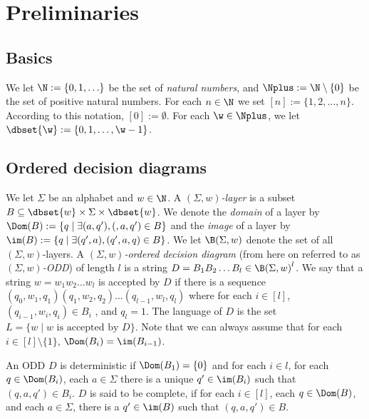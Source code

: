 \newpage
\section{Preliminaries}

\subsection{Basics}
We let $\N:= \{0,1, \ldots \}$ be the set of {\em natural numbers}, 
and $\Nplus:= \N \setminus \{0\}$ be the set of positive natural numbers. 
For each $n \in \N$ we set $[n]:=\{1,2, \ldots,n\}$. According to this notation,
$[0]:= \emptyset$. For each $\w \in \Nplus$, we let $\dbset{\w}:= \{0,1,\ldots,
\w-1\}$. 

\subsection{ Ordered decision diagrams} 
We let $\Sigma$ be an alphabet and $w \in \N$. A  $(\Sigma, w)$\emph{-layer} is a subset $B \subseteq \dbset{w} \times \Sigma \times \dbset{w}$. We denote the \emph{domain} of a layer by $\Dom(B):= \{q \;|\; \exists (a,q'), (,a,q') \in B\}$ and the \emph{image} of a layer by $\im(B):= \{q \;|\; \exists (q',a), (q',a,q) \in B\}$. We let  $\B(\Sigma, w)$ denote the set of all $(\Sigma,w)$-layers. A $(\Sigma,w)$\emph{-ordered decision diagram} (from here on referred to as $(\Sigma,w)$\emph{-ODD}) of length $l$ is a string $D = B_1B_2\ldots B_l \in {\B(\Sigma, w)}^l$. We say that a string $w=w_1 w_2 \ldots w_l$ is accepted by $D$ if there is a sequence $(q_0, w_1,q_1)(q_1,w_2,q_2)\ldots(q_{l-1},w_l,q_l)$ where for each $i \in [l]$, $(q_{i-1},w_i,q_i) \in B_i$ , and $q_l = 1$. The language of $D$ is the set $L= \{w\; | \; w \text{ is accepted by } D\}$. Note that we can always assume that for each $i \in [l] \setminus \{1\}$, $\Dom(B_i) = \im(B_{i-1})$. \

An ODD $D$ is deterministic if $\Dom(B_1) = \{0\}$ and for each $i \in l$, for each $q \in \Dom(B_i)$, each $a \in \Sigma$ there is a unique $q'\in \im(B_i)$ such that $(q,a,q') \in B_i$. $D$ is said to be complete, if for each 
$i\in [l]$, each $q\in \Dom(B)$, and each $a\in \Sigma$, 
there is a $q'\in \im(B)$ such that $(q,a,q')\in B$.\\

